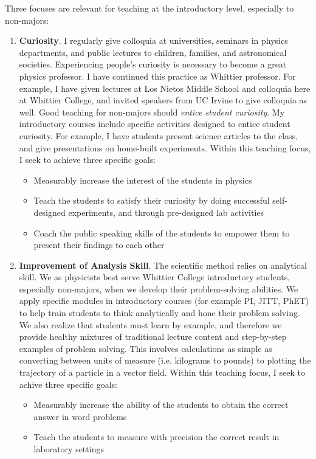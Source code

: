 \documentclass[../../main.tex]{subfiles}
\begin{document}
Three focuses are relevant for teaching at the introductory level, especially to non-majors:
\begin{enumerate}
\item \textbf{Curiosity}.  I regularly give colloquia at universities, seminars in physics departments, and public lectures to children, families, and astronomical societies.  Experiencing people's curiosity is necessary to become a great physics professor.  I have continued this practice as Whittier professor.  For example, I have given lectures at Los Nietos Middle School and colloquia here at Whittier College, and invited speakers from UC Irvine to give colloquia as well.  Good teaching for non-majors should \textit{entice student curiosity}.  My introductory courses include specific activities designed to entice student curiosity.  For example, I have students present science articles to the class, and give presentations on home-built experiments.  Within this teaching focus, I seek to achieve three specific goals:

\begin{itemize}
\item Measurably increase the interest of the students in physics %
\item Teach the students to satisfy their curiosity by doing successful self-designed experiments, and through pre-designed lab activities %
\item Coach the public speaking skills of the students to empower them to present their findings to each other %
\end{itemize}

\item \textbf{Improvement of Analysis Skill}.  The scientific method relies on analytical skill.  We as physicists best serve Whittier College introductory students, especially non-majors, when we develop their problem-solving abilities.  We apply specific modules in introductory courses (for example PI, JITT, PhET) to help train students to think analytically and hone their problem solving.  We also realize that students must learn by example, and therefore we provide healthy mixtures of traditional lecture content and step-by-step examples of problem solving.  This involves calculations as simple as converting between units of measure (i.e. kilograms to pounds) to plotting the trajectory of a particle in a vector field.  Within this teaching focus, I seek to achive three specific goals:

\begin{itemize}
\item Measurably increase the ability of the students to obtain the correct answer in word problems %
\item Teach the students to measure with precision the correct result in laboratory settings 
\end{itemize}


\end{enumerate}
\end{document}
